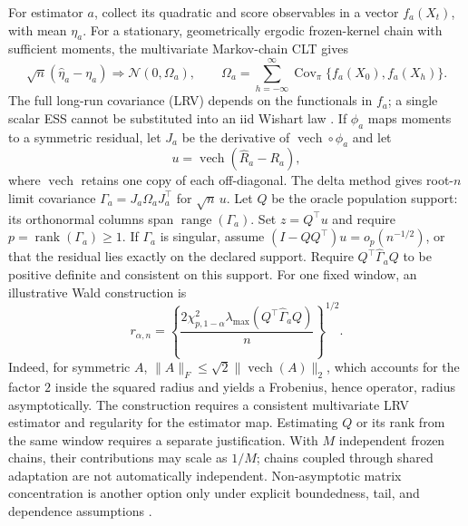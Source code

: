 \documentclass[11pt]{article}
\theoremstyle{plain}
\theoremstyle{definition}
\theoremstyle{remark}
\begin{document}
For estimator $a$, collect its quadratic and score observables in a vector
$f_a(X_t)$, with mean $\eta_a$. For a stationary,
geometrically ergodic frozen-kernel chain with sufficient moments, the
multivariate Markov-chain CLT gives
\begin{equation}
 \sqrt n(\widehat\eta_a-\eta_a)
 \Rightarrow\mathcal N(0,\Omega_a),\qquad
 \Omega_a=\sum_{h=-\infty}^{\infty}
 \operatorname{Cov}_\pi\{f_a(X_0),f_a(X_h)\}.                 \label{eq:mclt}
\end{equation}
The full long-run covariance (LRV) depends on the functionals in $f_a$; a
single scalar ESS cannot be substituted into an iid Wishart law
\citep{jones2004markov,vats2018strong}.
If $\phi_a$ maps moments to a symmetric residual, let $J_a$ be the derivative
of $\operatorname{vech}\circ\phi_a$ and let
\[
 u=\operatorname{vech}(\widehat R_a-R_a),
\]
where $\operatorname{vech}$ retains one copy of each off-diagonal. The delta
method gives root-$n$ limit covariance
$\Gamma_a=J_a\Omega_aJ_a^\top$ for $\sqrt n\,u$. Let $Q$ be the oracle
population support: its orthonormal columns span
$\operatorname{range}(\Gamma_a)$. Set $z=Q^\top u$ and require
$p=\operatorname{rank}(\Gamma_a)\ge1$. If $\Gamma_a$ is singular, assume
$(I-QQ^\top)u=o_p(n^{-1/2})$, or that the residual lies exactly on the declared
support. Require
$Q^\top\widehat\Gamma_aQ$ to be positive definite and consistent on this
support. For one fixed window, an illustrative Wald construction is
\begin{equation}
 r_{\alpha,n}=
 \left\{\frac{2\chi^2_{p,1-\alpha}
 \lambda_{\max}(Q^\top\widehat\Gamma_aQ)}{n}\right\}^{1/2}.   \label{eq:radius}
\end{equation}
Indeed, for symmetric $A$,
$\|A\|_F\le\sqrt{2}\|\operatorname{vech}(A)\|_2$, which accounts
for the factor $2$ inside the squared radius and yields a Frobenius, hence
operator, radius asymptotically. The construction requires a consistent
multivariate LRV estimator and regularity for the estimator map. Estimating $Q$ or
its rank from the same window requires a separate justification. With $M$
independent frozen chains, their contributions may scale as $1/M$; chains
coupled through shared adaptation are not automatically independent.
Non-asymptotic matrix concentration is another option only under explicit
boundedness, tail, and dependence assumptions \citep{neeman2024concentration}.
\end{document}
